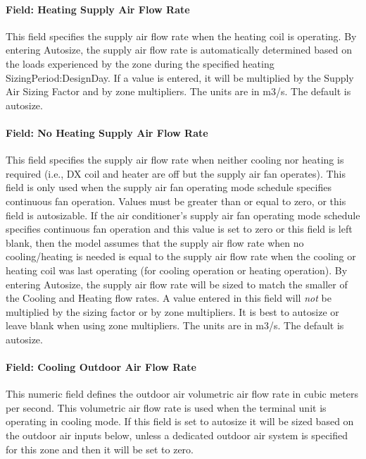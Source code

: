\paragraph{Field: Heating Supply Air Flow Rate}\label{field-heating-supply-air-flow-rate-3}

This field specifies the supply air flow rate when the heating coil is operating. By entering Autosize, the supply air flow rate is automatically determined based on the loads experienced by the zone during the specified heating SizingPeriod:DesignDay. If a value is entered, it will be multiplied by the Supply Air Sizing Factor and by zone multipliers. The units are in m3/s. The default is autosize.

\paragraph{Field: No Heating Supply Air Flow Rate}\label{field-no-heating-supply-air-flow-rate}

This field specifies the supply air flow rate when neither cooling nor heating is required (i.e., DX coil and heater are off but the supply air fan operates). This field is only used when the supply air fan operating mode schedule specifies continuous fan operation. Values must be greater than or equal to zero, or this field is autosizable. If the air conditioner's supply air fan operating mode schedule specifies continuous fan operation and this value is set to zero or this field is left blank, then the model assumes that the supply air flow rate when no cooling/heating is needed is equal to the supply air flow rate when the cooling or heating coil was last operating (for cooling operation or heating operation). By entering Autosize, the supply air flow rate will be sized to match the smaller of the Cooling and Heating flow rates. A value entered in this field will \emph{not} be multiplied by the sizing factor or by zone multipliers. It is best to autosize or leave blank when using zone multipliers. The units are in m3/s. The default is autosize.

\paragraph{Field: Cooling Outdoor Air Flow Rate}\label{field-cooling-outdoor-air-flow-rate}

This numeric field defines the outdoor air volumetric air flow rate in cubic meters per second. This volumetric air flow rate is used when the terminal unit is operating in cooling mode. If this field is set to autosize it will be sized based on the outdoor air inputs below, unless a dedicated outdoor air system is specified for this zone and then it will be set to zero.

